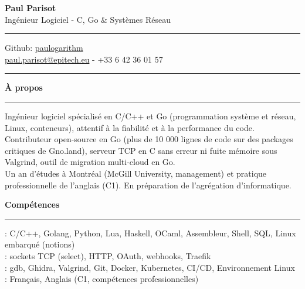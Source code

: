 \documentclass[9pt]{extarticle}
\begin{document}
\begin{center}
	{\huge\bfseries Paul Parisot}
	\\[4pt]
	{\Large Ingénieur Logiciel - C, Go \& Systèmes Réseau}
	\\
\end{center}

\par\vspace{-5pt}
\rule{\linewidth}{0.4pt}
\par\vspace{-5pt}

\begin{center}
	Github: \href{https://github.com/paulogarithm}{paulogarithm}
	\\
	\href{mailto:paul.parisot@epitech.eu}{paul.parisot@epitech.eu} - +33 6 42 36 01 57
	\\
\end{center}

\par\vspace{-10pt}
\rule{\linewidth}{0.4pt}
\par\vspace{7pt}

{\large\bfseries À propos}
\par\vspace{-8pt}
\rule{\linewidth}{0.4pt}
\par\vspace{5pt}

Ingénieur logiciel spécialisé en C/C++ et Go (programmation système et réseau, Linux, conteneurs), attentif à la fiabilité et à la performance du code.
\\
Contributeur open-source en Go (plus de 10 000 lignes de code sur des packages critiques de Gno.land), serveur TCP en C sans erreur ni fuite mémoire sous Valgrind, outil de migration multi-cloud en Go.
\\
Un an d'études à Montréal (McGill University, management) et pratique professionnelle de l'anglais (C1). En préparation de l'agrégation d'informatique.
\par\vspace{5pt}

{\large\bfseries Compétences}
\par\vspace{-8pt}
\rule{\linewidth}{0.4pt}
\par\vspace{5pt}

\hspace*{5pt}{\bfseries Maîtrise}: C/C++, Golang, Python, Lua, Haskell, OCaml, Assembleur, Shell, SQL, Linux embarqué (notions)
\\
\hspace*{5pt}{\bfseries Réseau \& API}: sockets TCP (select), HTTP, OAuth, webhooks, Traefik
\\
\hspace*{5pt}{\bfseries Outils}: gdb, Ghidra, Valgrind, Git, Docker, Kubernetes, CI/CD, Environnement Linux
\\
\hspace*{5pt}{\bfseries Langues}: Français, Anglais (C1, compétences professionnelles)
\end{document}
